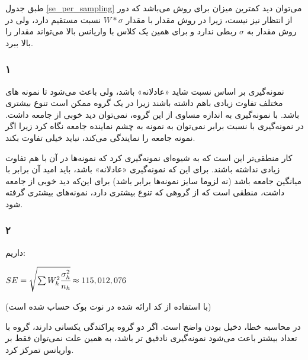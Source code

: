 \documentclass[12pt]{article}
\begin{document}
	طبق جدول 
	\ref{se_per_sampling}
	می‌توان دید کمترین میزان 
	برای روش 
	می‌باشد که دور از انتظار نیز نیست،‌ زیرا در روش 
	مقدار 
	با مقدار 
	$W * \sigma$ 
	نسبت مستقیم دارد، ولی در روش 
	مقدار 
	به 
	$\sigma$
	ربطی ندارد و برای همین یک کلاس با واریانس بالا می‌تواند مقدار 
	را بالا ببرد.
	\subsubsection{۱}
		نمونه‌گیری بر اساس نسبت شاید «عادلانه» باشد، ولی باعث می‌شود تا نمونه های مختلف تفاوت زیادی باهم داشته باشند زیرا در یک گروه ممکن است تنوع بیشتری باشد. با نمونه‌گیری به اندازه مساوی از این گروه، نمی‌توان دید خوبی از جامعه داشت. در نمونه‌گیری با نسبت برابر نمی‌توان به نمونه به چشم نماینده جامعه نگاه کرد زیرا اگر نمونه جامعه را نمایندگی می‌کند، نباید خیلی تفاوت بکند. 
		
		کار منطقی‌تر این است که به شیوه‌ای نمونه‌گیری کرد که نمونه‌ها در آن با هم تفاوت زیادی نداشته باشند. برای این که نمونه‌گیری «عادلانه» باشد، باید امید آن برابر با میانگین جامعه باشد (نه لزوما سایز نمونه‌ها برابر باشد) برای این‌که دید خوبی از جامعه داشت، منطقی است که از گروهی که تنوع بیشتری دارد، نمونه‌های بیشتری گرفته شود.
		
\subsubsection{۲}
داریم:
\begin{latin}
	$
	SE = \sqrt{\sum W_h^2 \cfrac{\sigma_h^2}{n_h}} \approx  115,012,076
	$
\end{latin}
(با استفاده از کد ارائه شده در نوت بوک حساب شده است)

در محاسبه خطا، دخیل بودن 
واضح است. اگر دو گروه پراکندگی یکسانی دارند، گروه با تعداد بیشتر باعث می‌شود نمونه‌گیری نادقیق تر باشد، به همین علت نمی‌توان فقط بر واریانس تمرکز کرد.
\end{document}
